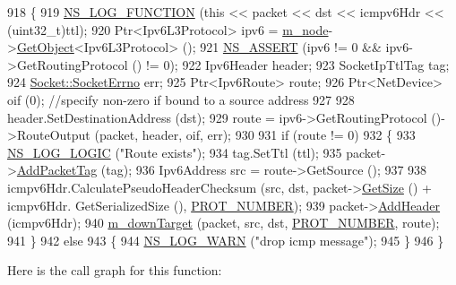 \begin{DoxyCode}
918 \{
919   \hyperlink{log-macros-disabled_8h_a90b90d5bad1f39cb1b64923ea94c0761}{NS\_LOG\_FUNCTION} (\textcolor{keyword}{this} << packet << dst << icmpv6Hdr << (uint32\_t)ttl);
920   Ptr<Ipv6L3Protocol> ipv6 = \hyperlink{classns3_1_1Icmpv6L4Protocol_a8968d1631f94f0b1cc1fd0e71ea0d0fe}{m\_node}->\hyperlink{classns3_1_1Object_a13e18c00017096c8381eb651d5bd0783}{GetObject}<Ipv6L3Protocol> ();
921   \hyperlink{assert_8h_a6dccdb0de9b252f60088ce281c49d052}{NS\_ASSERT} (ipv6 != 0 && ipv6->GetRoutingProtocol () != 0);
922   Ipv6Header header;
923   SocketIpTtlTag tag;
924   \hyperlink{classns3_1_1Socket_ada1328c5ae0c28cb2a982caf8f6d6cca}{Socket::SocketErrno} err;
925   Ptr<Ipv6Route> route;
926   Ptr<NetDevice> oif (0); \textcolor{comment}{//specify non-zero if bound to a source address}
927 
928   header.SetDestinationAddress (dst);
929   route = ipv6->GetRoutingProtocol ()->RouteOutput (packet, header, oif, err);
930 
931   \textcolor{keywordflow}{if} (route != 0)
932     \{
933       \hyperlink{group__logging_ga88acd260151caf2db9c0fc84997f45ce}{NS\_LOG\_LOGIC} (\textcolor{stringliteral}{"Route exists"});
934       tag.SetTtl (ttl);
935       packet->\hyperlink{classns3_1_1Packet_a7400b8655852f5271c5957250d0141af}{AddPacketTag} (tag);
936       Ipv6Address src = route->GetSource ();
937 
938       icmpv6Hdr.CalculatePseudoHeaderChecksum (src, dst, packet->\hyperlink{classns3_1_1Packet_a462855c9929954d4301a4edfe55f4f1c}{GetSize} () + icmpv6Hdr.
      GetSerializedSize (), \hyperlink{classns3_1_1Icmpv6L4Protocol_aa56c41a886a45b8b4f22a19afc827e2d}{PROT\_NUMBER});
939       packet->\hyperlink{classns3_1_1Packet_a465108c595a0bc592095cbcab1832ed8}{AddHeader} (icmpv6Hdr);
940       \hyperlink{classns3_1_1Icmpv6L4Protocol_a8cd5beb542044689be316d6e6963bb3a}{m\_downTarget} (packet, src, dst, \hyperlink{classns3_1_1Icmpv6L4Protocol_aa56c41a886a45b8b4f22a19afc827e2d}{PROT\_NUMBER}, route);
941     \}
942   \textcolor{keywordflow}{else}
943     \{
944       \hyperlink{group__logging_gade7208b4009cdf0e25783cd26766f559}{NS\_LOG\_WARN} (\textcolor{stringliteral}{"drop icmp message"});
945     \}
946 \}
\end{DoxyCode}


Here is the call graph for this function\+:



